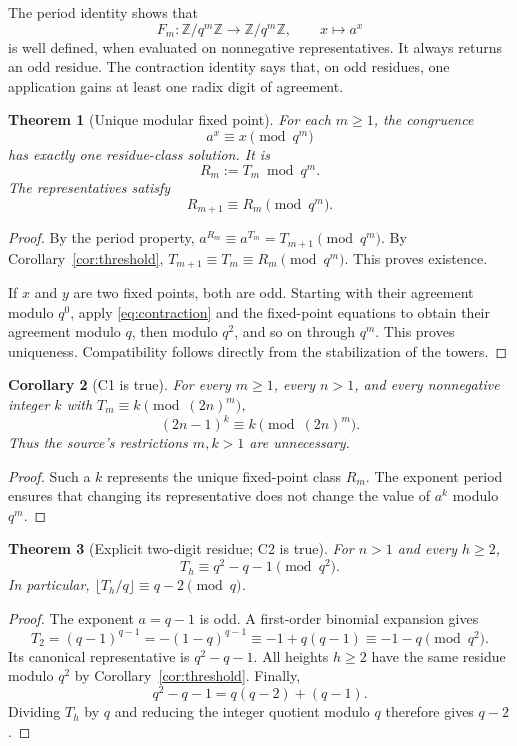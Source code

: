 \documentclass[11pt,a4paper]{article}
\numberwithin{equation}{section}
\theoremstyle{plain}
\newtheorem{theorem}{Theorem}[section]
\newtheorem{corollary}[theorem]{Corollary}
\theoremstyle{definition}
\newcommand{\Z}{\mathbb Z}
\begin{document}
The period identity shows that
\[
 F_m:\Z/q^m\Z\longrightarrow\Z/q^m\Z,\qquad x\longmapsto a^x
\]
is well defined, when evaluated on nonnegative representatives.
It always returns an odd residue.  The contraction identity says that,
on odd residues, one application gains at least one radix digit of
agreement.

\begin{theorem}[Unique modular fixed point]\label{thm:fixed}
For each $m\ge1$, the congruence
\begin{equation}\label{eq:fixed}
 a^x\equiv x\pmod{q^m}
\end{equation}
has exactly one residue-class solution.  It is
\[
 R_m:=T_m\bmod q^m.
\]
The representatives satisfy
\begin{equation}\label{eq:compatibility}
 R_{m+1}\equiv R_m\pmod{q^m}.
\end{equation}
\end{theorem}
\begin{proof}
By the period property, $a^{R_m}\equiv a^{T_m}=T_{m+1}\pmod{q^m}$.
By Corollary~\ref{cor:threshold}, $T_{m+1}\equiv T_m\equiv R_m\pmod{q^m}$.
This proves existence.

If $x$ and $y$ are two fixed points, both are odd.
Starting with their agreement modulo $q^0$, apply
\eqref{eq:contraction} and the fixed-point equations to obtain their
agreement modulo $q$, then modulo $q^2$, and so on through $q^m$.
This proves uniqueness.  Compatibility follows directly from the
stabilization of the towers.
\end{proof}

\begin{corollary}[C1 is true]\label{cor:C1}
For every $m\ge1$, every $n>1$, and every nonnegative integer $k$
with $T_m\equiv k\pmod{(2n)^m}$,
\[
 (2n-1)^k\equiv k\pmod{(2n)^m}.
\]
Thus the source's restrictions $m,k>1$ are unnecessary.
\end{corollary}
\begin{proof}
Such a $k$ represents the unique fixed-point class $R_m$.
The exponent period ensures that changing its representative does not
change the value of $a^k$ modulo $q^m$.
\end{proof}

\begin{theorem}[Explicit two-digit residue; C2 is true]\label{thm:C2}
For $n>1$ and every $h\ge2$,
\begin{equation}\label{eq:twodigit}
 T_h\equiv q^2-q-1\pmod{q^2}.
\end{equation}
In particular, $\lfloor T_h/q\rfloor\equiv q-2\pmod q$.
\end{theorem}
\begin{proof}
The exponent $a=q-1$ is odd.  A first-order binomial expansion gives
\[
 T_2=(q-1)^{q-1}=-(1-q)^{q-1}
 \equiv-1+q(q-1)\equiv-1-q\pmod{q^2}.
\]
Its canonical representative is $q^2-q-1$.
All heights $h\ge2$ have the same residue modulo $q^2$ by
Corollary~\ref{cor:threshold}.
Finally,
\[
 q^2-q-1=q(q-2)+(q-1).
\]
Dividing $T_h$ by $q$ and reducing the integer quotient modulo $q$
therefore gives $q-2$.
\end{proof}
\end{document}
